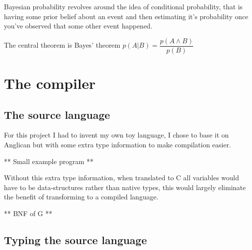\documentclass[a4paper]{article}
\begin{document}
Bayesian probability revolves around the idea of conditional probability, that is having some prior belief about an event and then estimating it's probability once you've observed that some other event happened.

The central theorem is Bayes' theorem \(p(A | B) = \dfrac{p(A \land B)}{p(B)}\)




\section{The compiler}




\subsection{The source language}

For this project I had to invent my own toy language, I chose to base it on Anglican but with some extra type information to make compilation easier.

** Small example program **

Without this extra type information, when translated to C all variables would have to be data-structures rather than native types, this would largely eliminate the benefit of transforming to a compiled language.

** BNF of G **




\subsection{Typing the source language}
\end{document}
